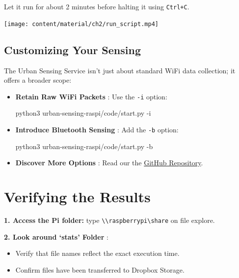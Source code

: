 \documentclass[
  letterpaper,
]{scrbook}
\newenvironment{Shaded}{\begin{snugshade}}{\end{snugshade}}
\newcommand{\AttributeTok}[1]{\textcolor[rgb]{0.40,0.45,0.13}{#1}}
\newcommand{\ExtensionTok}[1]{\textcolor[rgb]{0.00,0.23,0.31}{#1}}
\newcommand{\NormalTok}[1]{\textcolor[rgb]{0.00,0.23,0.31}{#1}}
\providecommand{\tightlist}{%
  \setlength{\itemsep}{0pt}\setlength{\parskip}{0pt}}\usepackage{longtable,booktabs,array}
\begin{document}
Let it run for about 2 minutes before halting it using \texttt{Ctrl+C}.

\texttt{[image: content/material/ch2/run\_script.mp4]}

\subsection{Customizing Your Sensing}\label{customizing-your-sensing}

The Urban Sensing Service isn't just about standard WiFi data
collection; it offers a broader scope:

\begin{itemize}
\item
  \textbf{Retain Raw WiFi Packets} : Use the \texttt{-i} option:

\begin{Shaded}
\begin{Highlighting}[]
\ExtensionTok{python3}\NormalTok{ urban{-}sensing{-}raspi/code/start.py }\AttributeTok{{-}i}
\end{Highlighting}
\end{Shaded}
\item
  \textbf{Introduce Bluetooth Sensing} : Add the \texttt{-b} option:

\begin{Shaded}
\begin{Highlighting}[]
\ExtensionTok{python3}\NormalTok{ urban{-}sensing{-}raspi/code/start.py }\AttributeTok{{-}b}
\end{Highlighting}
\end{Shaded}
\item
  \textbf{Discover More Options} : Read our the
  \href{https://github.com/jhyeonpark/urban-sensing-raspi}{GitHub
  Repository}.
\end{itemize}

\section{Verifying the Results}\label{verifying-the-results}

\textbf{1. Access the Pi folder:} type
\texttt{\textbackslash{}\textbackslash{}raspberrypi\textbackslash{}share}
on file explore.

\textbf{2. Look around `stats' Folder} :

\begin{itemize}
\tightlist
\item
  Verify that file names reflect the exact execution time.
\item
  Confirm files have been transferred to Dropbox Storage.
\end{itemize}
\end{document}
